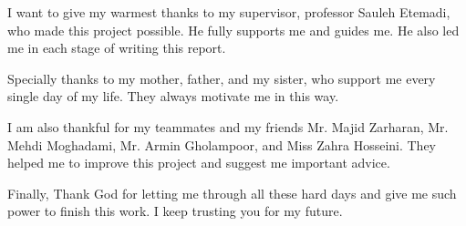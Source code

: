 
I want to give my warmest thanks to my supervisor, professor Sauleh Etemadi, who made this project possible. He fully supports me and guides me. He also led me in each stage of writing this report.  

Specially thanks to my mother, father, and my sister, who support me every single day of my life. They always motivate me in this way.

I am also thankful for my teammates and my friends Mr. Majid Zarharan, Mr. Mehdi Moghadami, Mr. Armin Gholampoor, and Miss Zahra Hosseini. They helped me to improve this project and suggest me important advice. 

Finally, Thank God for letting me through all these hard days and give me such power to finish this work. I keep trusting you for my future.  	